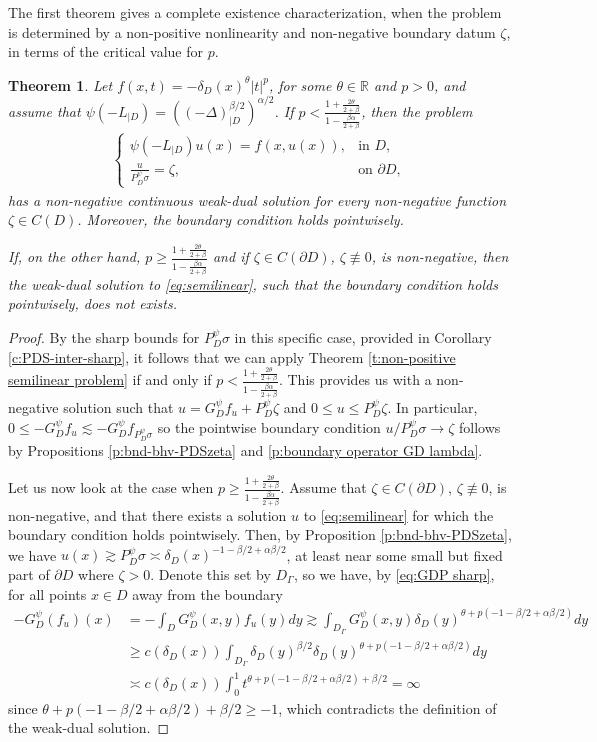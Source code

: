 \documentclass[12pt,a4paper,onecolumn]{article}
\newtheorem{thm}{Theorem}[section]
\theoremstyle{definition}
\newcommand{\R}{\mathbb{R}}
\newcommand{\1}{\mathbf 1}
\newcommand{\de}{\delta_D}
\newcommand{\Lo}{\psi(-L_{|D})}
\newcommand{\INTFR}{\left((-\Delta)^{\beta/2}_{|D}\right)^{\alpha/2}}
\newcommand{\GDP}{G_D^\psi}
\newcommand{\PDS}{P^{\psi}_{ D}}
\numberwithin{equation}{section}
\begin{document}
	The first theorem gives a complete existence characterization, when the problem is determined by  a non-positive nonlinearity and non-negative boundary datum $\zeta$, in terms of the critical value for $p$.
	\begin{thm}\label{t:frac-semi-neg}
		Let $f(x,t)=-\de(x)^\theta|t|^p$, for some $\theta\in \R$ and $p>0$, and assume that $\Lo=\INTFR$. If $p<\frac{1+\frac{2\theta}{2+\beta}}{1-\frac{\beta\alpha}{2+\beta}}$, then the problem
		\begin{align*}
			\begin{cases}
				\Lo u(x)=f(x,u(x)),&\textrm{in $D$},\\
				\frac{u}{\PDS\sigma}=\zeta,&\textrm{on $\partial D$},
			\end{cases}
		\end{align*}
		has a non-negative continuous weak-dual solution for every non-negative function $\zeta\in C(D)$. Moreover, the boundary condition holds pointwisely.
		
		If, on the other hand, $p\ge\frac{1+\frac{2\theta}{2+\beta}}{1-\frac{\beta\alpha}{2+\beta}}$ and if $\zeta\in C(\partial D)$, $\zeta\not\equiv 0$, is non-negative, then the weak-dual solution to \eqref{eq:semilinear}, such that the boundary condition holds pointwisely, does not exists.
	\end{thm}
	\begin{proof}
		By the sharp bounds for $\PDS\sigma$ in this specific case, provided in  Corollary \ref{c:PDS-inter-sharp}, it follows that we can apply Theorem \ref{t:non-positive semilinear problem} if and only if $p<\frac{1+\frac{2\theta}{2+\beta}}{1-\frac{\beta\alpha}{2+\beta}}$. This provides us with a non-negative solution such that $u=\GDP f_u+\PDS\zeta$ and $0\le u\le \PDS\zeta$. In particular, $0\le -\GDP f_u\lesssim -\GDP f_{\PDS\sigma}$ so the pointwise boundary condition $u/\PDS\sigma\to \zeta$ follows by Propositions \ref{p:bnd-bhv-PDSzeta} and \ref{p:boundary operator GD lambda}.
		
		Let us now look at the case when $p\ge\frac{1+\frac{2\theta}{2+\beta}}{1-\frac{\beta\alpha}{2+\beta}}$. Assume that $\zeta\in C(\partial D)$, $\zeta\not\equiv 0$, is non-negative, and that there exists a solution $u$ to \eqref{eq:semilinear} for which the boundary condition holds pointwisely. Then, by Proposition \ref{p:bnd-bhv-PDSzeta}, we have $u(x)\gtrsim \PDS\sigma\asymp \de(x)^{-1-\beta/2+\alpha\beta/2}$, at least near some small but fixed part of $\partial D$ where $\zeta>0$. Denote this set by $D_\Gamma$, so we have, by \eqref{eq:GDP sharp}, for all points $x\in D$ away from the boundary 
		\begin{align*}
			-\GDP(f_u)(x)&=-\int_D \GDP(x,y)f_u(y)dy\gtrsim \int_{D_\Gamma}\GDP(x,y) \de(y)^{\theta+p(-1-\beta/2+\alpha\beta/2)}dy\\
			 &\ge c(\de(x))\int_{D_\Gamma}\de(y)^{\beta/2} \de(y)^{\theta+p(-1-\beta/2+\alpha\beta/2)}dy\\
			 &\asymp c(\de(x))\int_0^1 t^{\theta+p(-1-\beta/2+\alpha\beta/2)+\beta/2}=\infty
		\end{align*}
		since $\theta+p(-1-\beta/2+\alpha\beta/2)+\beta/2\ge -1$,	 which contradicts the definition of the weak-dual solution.
	\end{proof}
	
\end{document}
